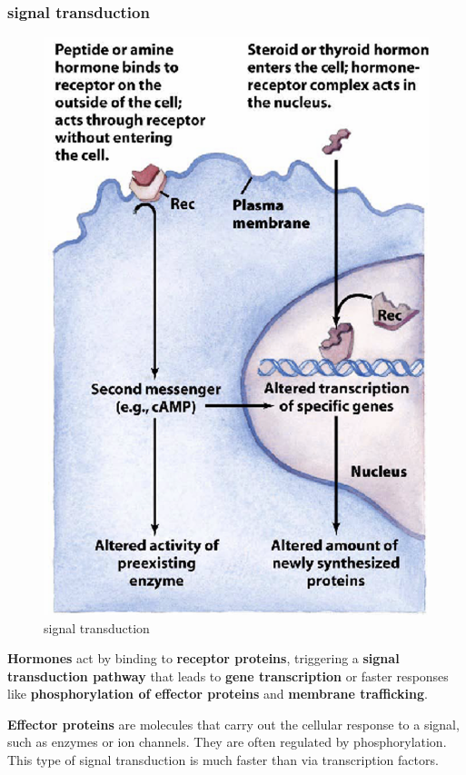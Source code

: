 \documentclass[../main.tex]{subfiles}
\begin{document}
\subsubsection{signal transduction}
\begin{figure}[H]
    \centering
    \includegraphics[width=0.3\linewidth]{signalTransduction.png}
    \caption{signal transduction}
    \label{fig:enter-label}
\end{figure}
\textbf{Hormones} act by binding to \textbf{receptor proteins}, triggering a \textbf{signal transduction pathway} that leads to \textbf{gene transcription} or faster responses like \textbf{phosphorylation of effector proteins} and \textbf{membrane trafficking}. 

\textbf{Effector proteins} are molecules that carry out the cellular response to a signal, such as enzymes or ion channels. They are often regulated by phosphorylation. This type of signal transduction is much faster than via transcription factors.
\end{document}
